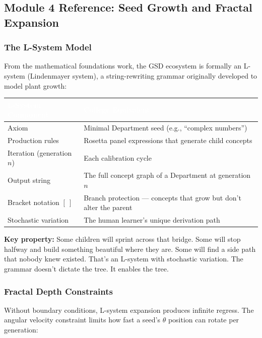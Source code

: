 \documentclass[11pt,letterpaper]{article}
\newcommand{\tableheader}[1]{\textbf{\sffamily\textcolor{white}{#1}}}
\begin{document}
\subsection{Module 4 Reference: Seed Growth and Fractal Expansion}

\subsubsection{The L-System Model}

From the mathematical foundations work, the GSD ecosystem is formally an L-system (Lindenmayer
system), a string-rewriting grammar originally developed to model plant growth:

\begin{center}
\begin{tabularx}{\textwidth}{L{3.5cm}X}
\toprule
{}
\tableheader{L-System Component} & \tableheader{College Equivalent} \\
\midrule
Axiom & Minimal Department seed (e.g., ``complex numbers'') \\
Production rules & Rosetta panel expressions that generate child concepts \\
Iteration (generation $n$) & Each calibration cycle \\
Output string & The full concept graph of a Department at generation $n$ \\
Bracket notation $[\ ]$ & Branch protection --- concepts that grow but don't alter the parent \\
Stochastic variation & The human learner's unique derivation path \\
\bottomrule
\end{tabularx}
\end{center}

\textbf{Key property:} Some children will sprint across that bridge. Some will stop halfway and
build something beautiful where they are. Some will find a side path that nobody knew existed.
That's an L-system with stochastic variation. The grammar doesn't dictate the tree. It enables
the tree.

\subsubsection{Fractal Depth Constraints}

Without boundary conditions, L-system expansion produces infinite regress. The angular velocity
constraint limits how fast a seed's $\theta$ position can rotate per generation:
\end{document}
